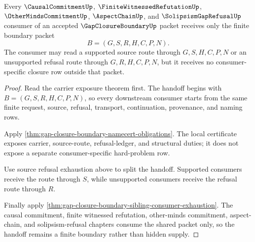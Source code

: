 \begin{theorem}
\label{thm:gap-closure-boundary-hard-problem-consumer-handoff}
Every $\CausalCommitmentUp$, $\FiniteWitnessedRefutationUp$, $\OtherMindsCommitmentUp$, $\AspectChainUp$, and $\SolipsismGapRefusalUp$ consumer of an accepted $\GapClosureBoundaryUp$ packet receives only the finite boundary packet
$$
B=(G,S,R,H,C,P,N).
$$
The consumer may read a supported source route through $G,S,H,C,P,N$ or an unsupported refusal route through $G,R,H,C,P,N$, but it receives no consumer-specific closure row outside that packet.
\end{theorem}
\begin{proof}
Read the carrier exposure theorem first. The handoff begins with $B=(G,S,R,H,C,P,N)$, so every downstream consumer starts from the same finite request, source, refusal, transport, continuation, provenance, and naming rows.

Apply \autoref{thm:gap-closure-boundary-namecert-obligations}. The local certificate exposes carrier, source-route, refusal-ledger, and structural duties; it does not expose a separate consumer-specific hard-problem row.

Use source refusal exhaustion above to split the handoff. Supported consumers receive the route through $S$, while unsupported consumers receive the refusal route through $R$.

Finally apply \autoref{thm:gap-closure-boundary-sibling-consumer-exhaustion}. The causal commitment, finite witnessed refutation, other-minds commitment, aspect-chain, and solipsism-refusal chapters consume the shared packet only, so the handoff remains a finite boundary rather than hidden supply.
\end{proof}

